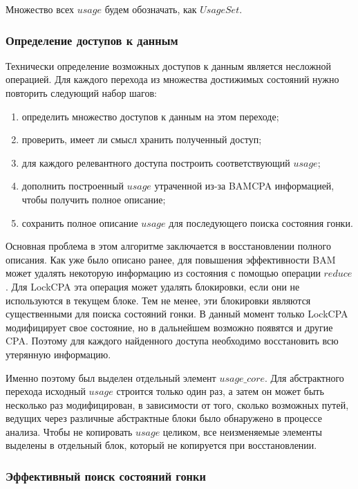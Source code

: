Множество всех $usage$ будем обозначать, как $UsageSet$. 

\subsubsection{Определение доступов к данным}

Технически определение возможных доступов к данным является несложной операцией.
Для каждого перехода из множества достижимых состояний нужно повторить следующий набор шагов:

\begin{enumerate}
\item определить множество доступов к данным на этом переходе;
\item проверить, имеет ли смысл хранить полученный доступ;
\item для каждого релевантного доступа построить соответствующий $usage$;
\item дополнить построенный $usage$ утраченной из-за BAMCPA информацией, чтобы получить полное описание;
\item сохранить полное описание $usage$ для последующего поиска состояния гонки.
\end{enumerate}

Основная проблема в этом алгоритме заключается в восстановлении полного описания.
Как уже было описано ранее, для повышения эффективности BAM может удалять некоторую информацию из состояния с помощью операции $reduce$.
Для LockCPA эта операция может удалять блокировки, если они не используются в текущем блоке.
Тем не менее, эти блокировки являются существенными для поиска состояний гонки.
В данный момент только LockCPA модифицирует свое состояние, но в дальнейшем возможно появятся и другие CPA.
Поэтому для каждого найденного доступа необходимо восстановить всю утерянную информацию.

Именно поэтому был выделен отдельный элемент $usage\_core$. 
Для абстрактного перехода исходный $usage$ строится только один раз, а затем он может быть несколько раз модифицирован, в зависимости от того, сколько возможных путей, ведущих через различные абстрактные блоки было обнаружено в процессе анализа.
Чтобы не копировать $usage$ целиком, все неизменяемые элементы выделены в отдельный блок, который не копируется при восстановлении.

\subsubsection{Эффективный поиск состояний гонки}

